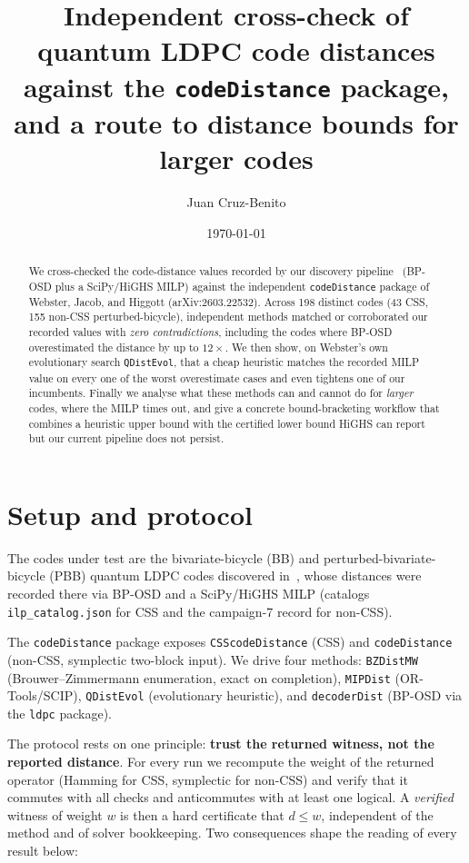 \documentclass[11pt]{article}
\title{Independent cross-check of quantum LDPC code distances against the
\texttt{codeDistance} package, and a route to distance bounds for larger codes}
\author{Juan Cruz-Benito}
\date{\today}
\newcommand{\dleq}{d\!\le}
\begin{document}
\maketitle

\begin{abstract}
We cross-checked the code-distance values recorded by our discovery
pipeline~\cite{qcode} (BP-OSD plus a SciPy/HiGHS MILP) against the independent
\texttt{codeDistance} package of
Webster, Jacob, and Higgott (arXiv:2603.22532). Across 198 distinct codes (43 CSS,
155 non-CSS perturbed-bicycle), independent methods matched or corroborated our
recorded values with \emph{zero contradictions}, including the codes where BP-OSD
overestimated the distance by up to $12\times$. We then show, on Webster's own
evolutionary search \texttt{QDistEvol}, that a cheap heuristic matches the recorded
MILP value on every one of the worst overestimate cases and even tightens one of
our incumbents. Finally we analyse what these methods can and cannot do for
\emph{larger} codes, where the MILP times out, and give a concrete
bound-bracketing workflow that combines a heuristic upper bound with the certified
lower bound HiGHS can report but our current pipeline does not persist.
\end{abstract}

\section{Setup and protocol}

The codes under test are the bivariate-bicycle (BB) and perturbed-bivariate-bicycle
(PBB) quantum LDPC codes discovered in~\cite{qcode}, whose distances were recorded
there via BP-OSD and a SciPy/HiGHS MILP (catalogs \texttt{ilp\_catalog.json} for
CSS and the campaign-7 record for non-CSS).

The \texttt{codeDistance} package exposes \texttt{CSScodeDistance} (CSS) and
\texttt{codeDistance} (non-CSS, symplectic two-block input). We drive four
methods: \texttt{BZDistMW} (Brouwer--Zimmermann enumeration, exact on
completion), \texttt{MIPDist} (OR-Tools/SCIP), \texttt{QDistEvol} (evolutionary
heuristic), and \texttt{decoderDist} (BP-OSD via the \texttt{ldpc} package).

The protocol rests on one principle: \textbf{trust the returned witness, not the
reported distance}. For every run we recompute the weight of the returned operator
(Hamming for CSS, symplectic for non-CSS) and verify that it commutes with all
checks and anticommutes with at least one logical. A \emph{verified} witness of
weight $w$ is then a hard certificate that $\dleq w$, independent of the method and
of solver bookkeeping. Two consequences shape the reading of every result below:
\end{document}
